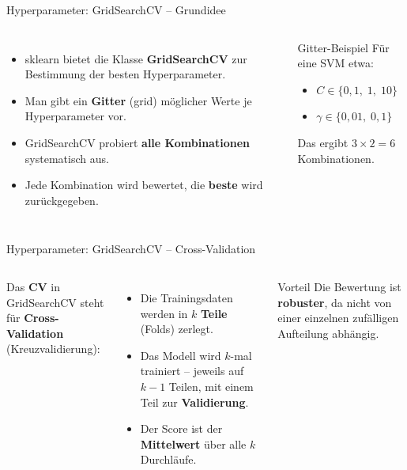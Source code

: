 \begin{frame}{Hyperparameter: GridSearchCV -- Grundidee}
\begin{columns}
\begin{itemize}
  \item sklearn bietet die Klasse \textbf{GridSearchCV} zur Bestimmung der
        besten Hyperparameter.
  \item Man gibt ein \textbf{Gitter} (grid) möglicher Werte je
        Hyperparameter vor.
  \item GridSearchCV probiert \textbf{alle Kombinationen} systematisch aus.
  \item Jede Kombination wird bewertet, die \textbf{beste} wird
        zurückgegeben.
\end{itemize}

\begin{blockC1}{Gitter-Beispiel}
Für eine SVM etwa:
\begin{itemize}
  \item $C \in \{0{,}1,\; 1,\; 10\}$
  \item $\gamma \in \{0{,}01,\; 0{,}1\}$
\end{itemize}
Das ergibt $3 \times 2 = 6$ Kombinationen.
\end{blockC1}
\end{columns}
\end{frame}

\begin{frame}{Hyperparameter: GridSearchCV -- Cross-Validation}
\begin{columns}
Das \textbf{CV} in GridSearchCV steht für \textbf{Cross-Validation}
(Kreuzvalidierung):
\begin{itemize}
  \item Die Trainingsdaten werden in $k$ \textbf{Teile} (Folds) zerlegt.
  \item Das Modell wird $k$-mal trainiert -- jeweils auf $k-1$ Teilen, mit
        einem Teil zur \textbf{Validierung}.
  \item Der Score ist der \textbf{Mittelwert} über alle $k$ Durchläufe.
\end{itemize}

\begin{blockC1}{Vorteil}
Die Bewertung ist \textbf{robuster}, da nicht von einer einzelnen
zufälligen Aufteilung abhängig.
\end{blockC1}
\end{columns}
\end{frame}

